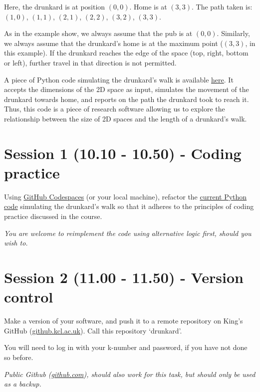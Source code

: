 \documentclass{article}
\begin{document}
Here, the drunkard is at position $(0, 0)$. 
Home is at $(3, 3)$. 
The path taken is: $(1, 0)$, $(1, 1)$, $(2, 1)$, $(2, 2)$, $(3, 2)$, $(3, 3)$.

As in the example show, we always assume that the pub is at $(0, 0)$.
Similarly, we always assume that the drunkard's home is at the maximum point ($(3, 3)$, in this example).
If the drunkard reaches the edge of the space (top, right, bottom or left), further travel in that direction is not permitted.

A piece of Python code simulating the drunkard's walk is available \href{https://github.com/martinteaching/sustainability/blob/master/workshops/kcl/2025/resources/drunkard.py}{here}.
It accepts the dimensions of the 2D space as input, simulates the movement of the drunkard towards home, and reports on the path the drunkard took to reach it.
Thus, this code is a piece of research software allowing us to explore the relationship between the size of 2D spaces and the length of a drunkard's walk.

\section{Session 1 (10.10 - 10.50) - Coding practice}

Using \href{https://github.com/martinteaching/sustainability/tree/master/workshops/kcl/2025#github-codespaces-recommended}{GitHub Codespaces} (or your local machine), refactor the \href{https://github.com/martinteaching/sustainability/blob/master/workshops/kcl/2025/resources/drunkard.py}{current Python code} simulating the drunkard's walk so that it adheres to the principles of coding practice discussed in the course.

\emph{You are welcome to reimplement the code using alternative logic first, should you wish to.}

\section{Session 2 (11.00 - 11.50) - Version control}

Make a version of your software, and push it to a remote repository on King's GitHub (\href{https://github.kcl.ac.uk/}{github.kcl.ac.uk}).
Call this repository `drunkard'.

You will need to log in with your k-number and password, if you have not done so before.

\textit{Public Github (\href{https://github.com}{github.com}), should
also work for this task, but should only be used as a backup.}
\end{document}
